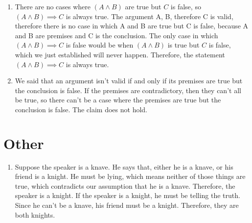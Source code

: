 \documentclass{article}
\begin{document}
\begin{enumerate}
		\item
			There are no cases where $(A \land B)$ are true but $C$ is false, so $(A \land B) \implies C$ is always true.
			The argument A, B, therefore C is valid, therefore there is no case in which A and B are true but C is false, because A and B are premises and C is the conclusion. The only case in which $(A \land B)\implies C$ is false would be when $(A \land B)$ is true but $C$ is false, which we just established will never happen. Therefore, the statement $(A \land B) \implies C$ is always true.
		\item
			We said that an argument isn't valid if and only if its premises are true but the conclusion is false. If the premises are contradictory, then they can't all be true, so there can't be a case where the premises are true but the conclusion is false. The claim does not hold. 
	\end{enumerate}
	\section{Other}
	\begin{enumerate}
		\item
			Suppose the speaker is a knave. He says that, either he is a knave, or his friend is a knight. He must be lying, which means neither of those things are true, which contradicts our assumption that he is a knave. Therefore, the speaker is a knight. If the speaker is a knight, he must be telling the truth. Since he can't be a knave, his friend must be a knight. Therefore, they are both knights.
	\end{enumerate}
\end{document}
